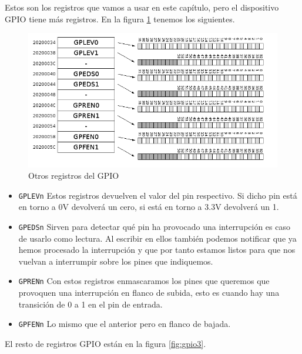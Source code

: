 Estos son los registros que vamos a usar en este capítulo, pero el dispositivo GPIO tiene
más registros. En la figura \ref{fig:gpio2} tenemos los siguientes.

\begin{figure}[h]
  \centering
    \includegraphics[width=14cm]{graphs/gpio2.png}
  \caption{Otros registros del GPIO}
  \label{fig:gpio2}
\end{figure}

\begin{itemize}
  \item {\tt GPLEVn} Estos registros devuelven el valor del pin respectivo. Si dicho pin está
        en torno a 0V devolverá un cero, si está en torno a 3.3V devolverá un 1.
  \item {\tt GPEDSn} Sirven para detectar qué pin ha provocado una interrupción es caso de
        usarlo como lectura. Al escribir en ellos también podemos notificar que ya hemos procesado
        la interrupción y que por tanto estamos listos para que nos vuelvan a interrumpir sobre
        los pines que indiquemos.
  \item {\tt GPRENn} Con estos registros enmascaramos los pines que queremos que provoquen una
        interrupción en flanco de subida, esto es cuando hay una transición de 0 a 1 en el pin
        de entrada.
  \item {\tt GPFENn} Lo mismo que el anterior pero en flanco de bajada.
\end{itemize}

El resto de registros GPIO están en la figura \ref{fig:gpio3}.


